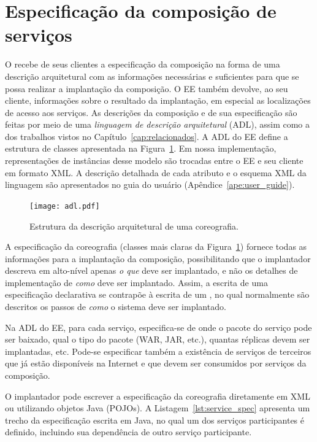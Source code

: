 \section{Especificação da composição de serviços}
\label{sec:spec}

O \ee recebe de seus clientes a especificação da composição na forma 
de uma descrição arquitetural com as informações necessárias e suficientes para 
que se possa realizar a implantação da composição. 
O EE também devolve, ao seu cliente, informações sobre o resultado da implantação, 
em especial as localizações de acesso aos serviços. As descrições da composição e de sua 
especificação são feitas por meio de uma \emph{linguagem de descrição arquitetural} (ADL), 
assim como a dos trabalhos vistos no Capítulo~\ref{cap:relacionados}. 
A ADL do EE define a estrutura de classes apresentada na Figura~\ref{fig:adl}. 
Em nossa implementação, representações de instâncias desse modelo 
são trocadas entre o EE e seu cliente em formato XML. 
A descrição detalhada de cada atributo e o esquema XML da linguagem
são apresentados no guia do usuário (Apêndice~\ref{ape:user_guide}).

\begin{figure}[!h]
  \centering
  \texttt{[image: adl.pdf]} 
  \caption{Estrutura da descrição arquitetural de uma coreografia.}
  \label{fig:adl} 
\end{figure}

A especificação da coreografia (classes mais claras da Figura~\ref{fig:adl})
fornece todas as informações para a implantação da composição,
possibilitando que o implantador descreva em alto-nível apenas \emph{o que} deve ser implantado,
e não os detalhes de implementação de \emph{como} deve ser implantado.
Assim, a escrita de uma especificação declarativa se contrapõe à escrita de um \script,
no qual normalmente são descritos os passos de \emph{como} o sistema deve ser implantado.

Na ADL do EE, para cada serviço, especifica-se de onde o pacote do serviço pode ser baixado, 
qual o tipo do pacote (WAR, JAR, etc.), quantas réplicas devem ser implantadas, etc.
Pode-se especificar também a existência de serviços
de terceiros que já estão disponíveis na Internet e que devem
ser consumidos por serviços da composição.

O implantador pode escrever a especificação da coreografia diretamente em XML
ou utilizando objetos Java (POJOs).
A Listagem~\ref{lst:service_spec} apresenta um trecho da especificação escrita em Java,
no qual um dos serviços participantes é definido,
incluindo sua dependência de outro serviço participante.

